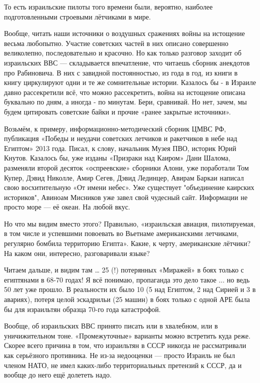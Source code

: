 То есть израильские пилоты того времени были, вероятно, наиболее подготовленными строевыми лётчиками в мире.

Вообще, читать наши источники о воздушных сражениях войны на истощение весьма любопытно. Участие советских частей в них описано совершенно великолепно, последовательно и красочно. Но как только разговор заходит об израильских ВВС — складывается впечатление, что читаешь сборник анекдотов про Рабиновича. В них с завидной постоянностью, из года в год, из книги в книгу циркулируют одни и те же сомнительные истории. Казалось бы - в Израиле давно рассекретили всё, что можно рассекретить, война на истощение описана буквально по дням, а иногда - по минутам. Бери, сравнивай. Но нет, зачем, мы будем цитировать советские байки и прочие «ранее закрытые источники».

Возьмём, к примеру, информационно-методический сборник ЦМВС РФ, публикация «Победы и неудачи советских летчиков и ракетчиков в небе над Египтом» 2013 года. Писал, к слову, начальник Музея ПВО, историк Юрий Кнутов. Казалось бы, уже изданы «Призраки над Каиром» Дани Шалома, разменяли второй десяток «оспреевские» сборники Алони, уже поработали Том Купер, Дэвид Николле, Амир Сегев, Дэвид Лединцер, Авирам Баркаи написал свою восхитительную «От имени небес». Уже существует "объединение каирских историков", Авиноам Мисников уже завел свой чудесный сайт. Информации не просто море — её океан. На любой вкус.

Но что мы видим вместо этого? Правильно, «израильская авиация, пилотируемая, в том числе и успевшими повоевать во Вьетнаме американскими летчиками, регулярно бомбила территорию Египта». Какие, к черту, американские лётчики? На каком они, интересно, разговаривали языке?

Читаем дальше, и видим там … 25 (!) потерянных «Миражей» в боях только с египтянами в 68-70 годах! Я всё понимаю, пропаганда это дело такое ... но ведь 50 лет уже прошло. В реальности их было 10 (5 над Египтом, 2 над Сирией и 3 в авариях), потеря целой эскадрильи (25 машин) в боях только с одной АРЕ была бы для израильтян образца 70-го года катастрофой.

Вообще, об израильских ВВС принято писать или в хвалебном, или в уничижительном тоне. «Промежуточные» варианты можно встретить куда реже. Скорее всего причина в том, что израильтян в СССР никогда не рассматривали как серьёзного противника. Не из-за недооценки — просто Израиль не был членом НАТО, не имел каких-либо территориальных претензий к СССР, да и вообще до него ещё долететь надо.

